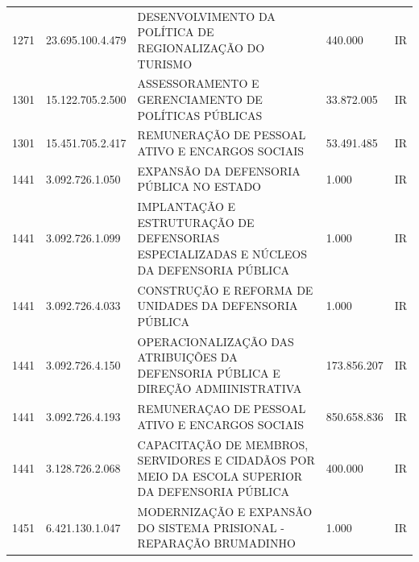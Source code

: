\documentclass{article}
\begin{document}
\begin{longtable}[c]{m{1cm}|m{2cm}|m{10cm}|m{2cm}|m{1cm}}
\multicolumn{1}{C{1cm}|}{1271} & \multicolumn{1}{C{2cm}|}{23.695.100.4.479} & \multicolumn{1}{L{10cm}|}{DESENVOLVIMENTO DA POLÍTICA DE REGIONALIZAÇÃO DO TURISMO} & \multicolumn{1}{R{2cm}|}{440.000} & \multicolumn{1}{C{1cm}}{IR} \\
\multicolumn{1}{C{1cm}|}{1301} & \multicolumn{1}{C{2cm}|}{15.122.705.2.500} & \multicolumn{1}{L{10cm}|}{ASSESSORAMENTO E GERENCIAMENTO DE POLÍTICAS PÚBLICAS} & \multicolumn{1}{R{2cm}|}{33.872.005} & \multicolumn{1}{C{1cm}}{IR} \\
\multicolumn{1}{C{1cm}|}{1301} & \multicolumn{1}{C{2cm}|}{15.451.705.2.417} & \multicolumn{1}{L{10cm}|}{REMUNERAÇÃO DE PESSOAL ATIVO E ENCARGOS SOCIAIS} & \multicolumn{1}{R{2cm}|}{53.491.485} & \multicolumn{1}{C{1cm}}{IR} \\
\multicolumn{1}{C{1cm}|}{1441} & \multicolumn{1}{C{2cm}|}{3.092.726.1.050} & \multicolumn{1}{L{10cm}|}{EXPANSÃO DA DEFENSORIA PÚBLICA NO ESTADO} & \multicolumn{1}{R{2cm}|}{1.000} & \multicolumn{1}{C{1cm}}{IR} \\
\multicolumn{1}{C{1cm}|}{1441} & \multicolumn{1}{C{2cm}|}{3.092.726.1.099} & \multicolumn{1}{L{10cm}|}{IMPLANTAÇÃO E ESTRUTURAÇÃO DE DEFENSORIAS ESPECIALIZADAS E NÚCLEOS DA DEFENSORIA PÚBLICA} & \multicolumn{1}{R{2cm}|}{1.000} & \multicolumn{1}{C{1cm}}{IR} \\
\multicolumn{1}{C{1cm}|}{1441} & \multicolumn{1}{C{2cm}|}{3.092.726.4.033} & \multicolumn{1}{L{10cm}|}{CONSTRUÇÃO E REFORMA DE UNIDADES DA DEFENSORIA PÚBLICA} & \multicolumn{1}{R{2cm}|}{1.000} & \multicolumn{1}{C{1cm}}{IR} \\
\multicolumn{1}{C{1cm}|}{1441} & \multicolumn{1}{C{2cm}|}{3.092.726.4.150} & \multicolumn{1}{L{10cm}|}{OPERACIONALIZAÇÃO DAS ATRIBUIÇÕES DA DEFENSORIA PÚBLICA E DIREÇÃO ADMIINISTRATIVA} & \multicolumn{1}{R{2cm}|}{173.856.207} & \multicolumn{1}{C{1cm}}{IR} \\
\multicolumn{1}{C{1cm}|}{1441} & \multicolumn{1}{C{2cm}|}{3.092.726.4.193} & \multicolumn{1}{L{10cm}|}{REMUNERAÇAO DE PESSOAL ATIVO E ENCARGOS SOCIAIS} & \multicolumn{1}{R{2cm}|}{850.658.836} & \multicolumn{1}{C{1cm}}{IR} \\
\multicolumn{1}{C{1cm}|}{1441} & \multicolumn{1}{C{2cm}|}{3.128.726.2.068} & \multicolumn{1}{L{10cm}|}{CAPACITAÇÃO DE MEMBROS, SERVIDORES E CIDADÃOS POR MEIO DA ESCOLA SUPERIOR DA DEFENSORIA PÚBLICA} & \multicolumn{1}{R{2cm}|}{400.000} & \multicolumn{1}{C{1cm}}{IR} \\
\multicolumn{1}{C{1cm}|}{1451} & \multicolumn{1}{C{2cm}|}{6.421.130.1.047} & \multicolumn{1}{L{10cm}|}{MODERNIZAÇÃO E EXPANSÃO DO SISTEMA PRISIONAL - REPARAÇÃO BRUMADINHO} & \multicolumn{1}{R{2cm}|}{1.000} & \multicolumn{1}{C{1cm}}{IR} \\

\end{longtable}
\end{document}
